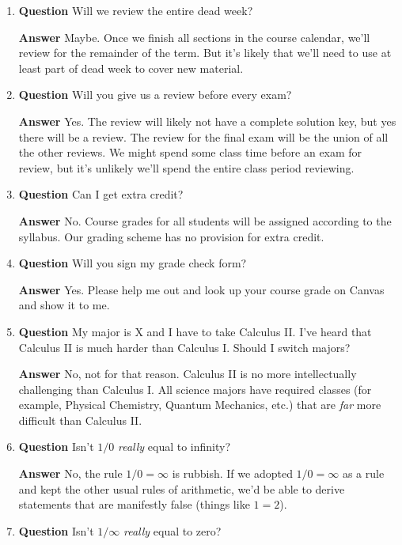 \documentclass[11pt]{article}
\newcounter{ex}\setcounter{ex}{0}
\begin{document}
\begin{enumerate}
\item  \textbf{Question}  Will  we review the entire dead week?

\textbf{Answer} Maybe.  Once we finish all sections in the course 
calendar, we'll review for the remainder of the term.  But it's 
likely that we'll need to use at least part of dead week to cover
new material. 


\item  \textbf{Question}  Will you give us a review before every exam?

\textbf{Answer} Yes. The review will likely not have a complete solution key, 
but yes there will be a review. The review for the final exam will be the union 
of all the other reviews.  We might spend some class time before an exam for review, 
but it's unlikely we'll spend the entire class period reviewing. 

\item  \textbf{Question}  Can I get extra credit?

\textbf{Answer} No. Course grades for all students will be
assigned according to the syllabus. Our grading scheme has 
no provision for extra credit. 

\item  \textbf{Question}  Will you sign my grade check form?

\textbf{Answer} Yes.  Please help me out and look up your course grade on Canvas and 
show it to me.

\item  \textbf{Question}  My major is X and I have to take Calculus II.  I've heard 
that Calculus II is much harder than Calculus I.  Should I switch majors?

 \textbf{Answer}  No, not for that reason. Calculus II is no more intellectually 
 challenging than Calculus I. All science majors have required classes 
 (for example, Physical Chemistry, Quantum Mechanics, etc.) that
are \emph{far} more difficult than Calculus II. 

\item  \textbf{Question} Isn't \(1/0\) \emph{really} equal to infinity?

  \textbf{Answer}  No,  the rule  \(1/0 = \infty\)  is rubbish. If we adopted   
   \(1/0 = \infty\) as a rule and kept the other usual rules of arithmetic, we'd 
   be able to derive statements that
are manifestly false (things like \(1 = 2\)).


\item  \textbf{Question} Isn't \(1/\infty \) \emph{really} equal to zero?


\end{enumerate}
\end{document}
